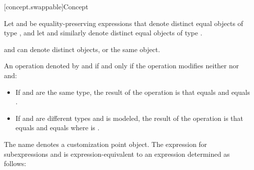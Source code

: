 [concept.swappable]{Concept }

\pnum
Let  and  be equality-preserving expressions that denote
distinct equal objects of type , and let  and 
similarly denote distinct equal objects of type .
\begin{note}
 and  can denote distinct objects, or the same object.
\end{note}
An operation
 denoted by  and  if and only
if the operation modifies neither  nor  and:
\begin{itemize}
\item If  and  are the same type, the result of the operation
  is that  equals  and  equals .

\item If  and  are different types and
  is modeled,
  the result of the operation is that
   equals 
  and
   equals 
  where  is .
\end{itemize}

\pnum
{}%
The name  denotes a customization point
object. The expression
 for subexpressions 
and  is expression-equivalent to an expression
 determined as follows:

